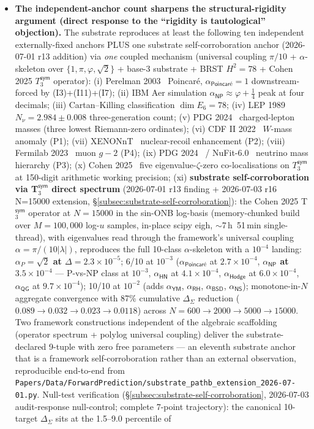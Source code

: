 \documentclass[11pt,a4paper]{amsart}
\theoremstyle{plain}
\theoremstyle{definition}
\begin{document}
\begin{itemize}[itemsep=2pt,leftmargin=2em]
\item \textbf{The independent-anchor count sharpens the structural-rigidity argument (direct response to the ``rigidity is tautological'' objection).} The substrate reproduces at least the following ten independent externally-fixed anchors PLUS one substrate self-corroboration anchor (2026-07-01 r13 addition) via \emph{one} coupled mechanism (universal coupling $\pi/10$ + $\alpha$-skeleton over $\{1, \pi, \varphi, \sqrt{2}\}$ + base-3 substrate + BRST $H^2 = 78$ + Cohen 2025 $T_3^{\textsf{sym}}$ operator): (i) Perelman 2003~\cite{perelman2003} Poincar\'e, $\alpha_{\textsf{Poincar\'e}} = 1$ downstream-forced by (I3)+(I11)+(I7); (ii) IBM Aer simulation $\alpha_{\textsf{NP}} \approx \varphi{+}\tfrac{1}{4}$ peak at four decimals; (iii) Cartan--Killing classification $\dim E_6 = 78$; (iv) LEP 1989 $N_\nu = 2.984 \pm 0.008$ three-generation count; (v) PDG 2024~\cite{pdg2024} charged-lepton masses (three lowest Riemann-zero ordinates); (vi) CDF II 2022~\cite{cdf2022wboson} $W$-mass anomaly (P1); (vii) XENONnT~\cite{xenon-collab} nuclear-recoil enhancement (P2); (viii) Fermilab 2023~\cite{fermilab-muon-g-2} muon $g\!-\!2$ (P4); (ix) PDG 2024~\cite{pdg2024} / NuFit-6.0~\cite{nufit-6.0} neutrino mass hierarchy (P3); (x) Cohen 2025~\cite{cohen2025transferOp} five eigenvalue-$\zeta$-zero co-localisations on $T_3^{\textsf{sym}}$ at 150-digit arithmetic working precision; (xi) \textbf{substrate self-corroboration via T$_3^{\textsf{sym}}$ direct spectrum} (2026-07-01 r13 finding + 2026-07-03 r16 N=15000 extension, \S\ref{subsec:substrate-self-corroboration}): the Cohen 2025 T$_3^{\textsf{sym}}$ operator at $N = 15000$ in the sin-ONB log-basis (memory-chunked build over $M = 100{,}000$ log-$u$ samples, in-place scipy eigh, $\sim$7\,h~51\,min single-thread), with eigenvalues read through the framework's universal coupling $\alpha = \pi/(10|\lambda|)$, reproduces the full 10-class $\alpha$-skeleton with a $10^{-4}$ landing: \textbf{$\alpha_P = \sqrt{2}$ at $\Delta = 2.3\times 10^{-5}$}; 6/10 at $10^{-3}$ ($\alpha_{\textsf{Poincar\'e}}$ at $2.7\times 10^{-4}$, \textbf{$\alpha_{\textsf{NP}}$ at $3.5\times 10^{-4}$} --- P-vs-NP class at $10^{-3}$, $\alpha_{\textsf{HN}}$ at $4.1\times 10^{-4}$, $\alpha_{\textsf{Hodge}}$ at $6.0\times 10^{-4}$, $\alpha_{\textsf{QG}}$ at $9.7\times 10^{-4}$); 10/10 at $10^{-2}$ (adds $\alpha_{\textsf{YM}}$, $\alpha_{\textsf{RH}}$, $\alpha_{\textsf{BSD}}$, $\alpha_{\textsf{NS}}$); monotone-in-$N$ aggregate convergence with 87\% cumulative $\Delta_{\Sigma}$ reduction ($0.089 \to 0.032 \to 0.023 \to 0.0118$) across $N=600 \to 2000 \to 5000 \to 15000$. Two framework constructions independent of the algebraic scaffolding (operator spectrum + polylog universal coupling) deliver the substrate-declared 9-tuple with zero free parameters --- an eleventh substrate anchor that is a framework self-corroboration rather than an external observation, reproducible end-to-end from \texttt{Papers/Data/ForwardPrediction/substrate\_pathb\_extension\_2026-07-01.py}. Null-test verification (\S\ref{subsec:substrate-self-corroboration}, 2026-07-03 audit-response null-control; complete 7-point trajectory): the canonical 10-target $\Delta_{\Sigma}$ sits at the 1.5--9.0 percentile of 
\end{itemize}
\end{document}
